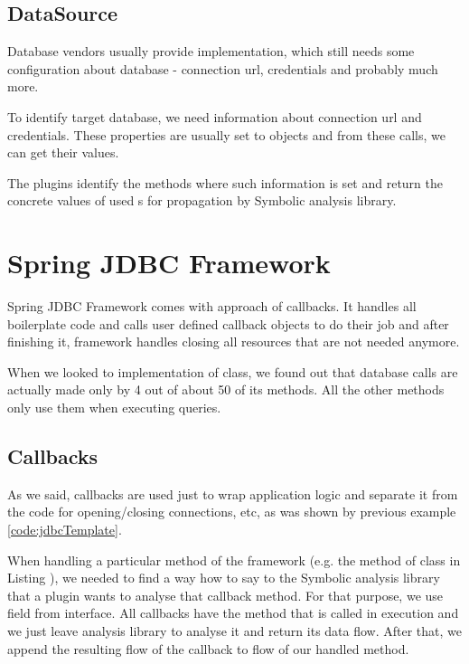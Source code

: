 \subsection{DataSource \label{implementation:dataSource}}

Database vendors usually provide  implementation, which still
needs some configuration about database - connection url, credentials and probably much more.

To identify target database, we need information about connection url and credentials. These properties
are usually set to  objects and from these calls, we can get
their values.

The plugins identify the methods where such information is set and return
the concrete values of used s for propagation by Symbolic analysis library.



\section{Spring JDBC Framework}

Spring JDBC Framework comes with approach of callbacks. It handles
all boilerplate code and calls user defined callback objects to do their job
and after finishing it, framework handles closing all resources that are not needed anymore.

When we looked to implementation of  class, we found out
that database calls are actually made only by 4 out of about 50 of its methods.
All the other methods only use them when executing queries.



\subsection{Callbacks}

As we said, callbacks are used just to wrap application logic and
separate it from the code for opening/closing connections, etc,
as was shown by previous example \ref{code:jdbcTemplate}.

When handling a particular method of the framework (e.g. the 
method of  class in Listing ),
we needed to find a way how to say to the Symbolic analysis library that a plugin wants to
analyse that callback method. For that purpose, we use
field  from interface.
All callbacks have the method that is called in execution
and we just leave analysis library to analyse it and return
its data flow. After that, we append the resulting flow of the callback
to flow of our handled method.

